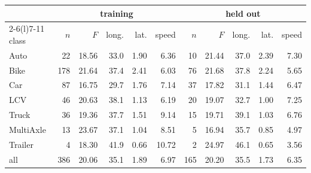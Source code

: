 \begin{tabular}{@{}l rrrrr rrrrr@{}}\toprule
 & \multicolumn{5}{c}{training} & \multicolumn{5}{c}{held out}\\
\cmidrule(lr){2-6}\cmidrule(l){7-11}
class & $n$ & $F$ & long. & lat. & speed & $n$ & $F$ & long. & lat. & speed\\\midrule
Auto & 22 & 18.56 & 33.0 & 1.90 & 6.36 & 10 & 21.44 & 37.0 & 2.39 & 7.30\\
Bike & 178 & 21.64 & 37.4 & 2.41 & 6.03 & 76 & 21.68 & 37.8 & 2.24 & 5.65\\
Car & 87 & 16.75 & 29.7 & 1.76 & 7.14 & 37 & 17.82 & 31.1 & 1.44 & 6.47\\
LCV & 46 & 20.63 & 38.1 & 1.13 & 6.19 & 20 & 19.07 & 32.7 & 1.00 & 7.25\\
Truck & 36 & 19.36 & 37.7 & 1.51 & 9.14 & 15 & 19.71 & 39.1 & 1.03 & 6.76\\
MultiAxle & 13 & 23.67 & 37.1 & 1.04 & 8.51 & 5 & 16.94 & 35.7 & 0.85 & 4.97\\
Trailer & 4 & 18.30 & 41.9 & 0.66 & 10.72 & 2 & 24.97 & 46.1 & 0.65 & 3.56\\
\midrule all & 386 & 20.06 & 35.1 & 1.89 & 6.97 & 165 & 20.20 & 35.5 & 1.73 & 6.35\\
\bottomrule\end{tabular}
